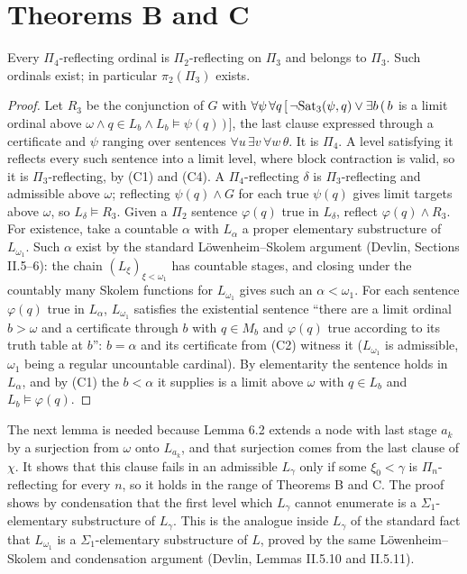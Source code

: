 \documentclass[11pt]{article}
\begin{document}
\section{Theorems B and C}

\begin{statement} Every $\Pi_4$-reflecting ordinal is $\Pi_2$-reflecting on $\Pi_3$ and belongs to $\Pi_3$.
Such ordinals exist; in particular $\pi_2(\Pi_3)$ exists.
\end{statement}

\begin{proof}
Let $R_3$ be the conjunction of $G$ with $\forall\psi\, \forall q\, [\, \neg\mathrm{Sat}_3(\psi, q) \vee \exists b\, (\, b$ is
a limit ordinal above $\omega \wedge q \in L_b \wedge L_b \models \psi(q)\, )\, ]$, the last clause expressed through
a certificate and $\psi$ ranging over sentences $\forall u\, \exists v\, \forall w\, \theta$. It is $\Pi_4$. A level
satisfying it reflects every such sentence into a limit level, where block contraction is valid, so it is
$\Pi_3$-reflecting, by (C1) and (C4). A $\Pi_4$-reflecting $\delta$ is $\Pi_3$-reflecting and admissible above
$\omega$; reflecting $\psi(q) \wedge G$ for each true $\psi(q)$ gives limit targets above $\omega$, so
$L_{\delta} \models R_3$. Given a $\Pi_2$ sentence $\varphi(q)$ true in $L_{\delta}$, reflect $\varphi(q) \wedge R_3$.
For existence, take a countable $\alpha$ with $L_{\alpha}$ a proper elementary substructure of $L_{\omega_1}$. Such
$\alpha$ exist by the standard L\"owenheim--Skolem argument (Devlin, Sections II.5--6): the
chain $(L_{\xi})_{\xi < \omega_1}$ has countable stages, and closing under the countably many Skolem functions for
$L_{\omega_1}$ gives such an $\alpha < \omega_1$. For each sentence $\varphi(q)$ true in $L_{\alpha}$, $L_{\omega_1}$
satisfies the existential sentence ``there are a limit ordinal $b > \omega$ and a certificate through $b$ with
$q \in M_b$ and $\varphi(q)$ true according to its truth table at $b$'': $b = \alpha$ and its certificate from (C2)
witness it ($L_{\omega_1}$ is admissible, $\omega_1$ being a regular uncountable cardinal). By elementarity the
sentence holds in $L_{\alpha}$, and by (C1) the $b < \alpha$ it supplies is a limit above $\omega$ with
$q \in L_b$ and $L_b \models \varphi(q)$.
\end{proof}

The next lemma is needed because Lemma 6.2 extends a node with last stage $a_k$ by a surjection from $\omega$ onto
$L_{a_k}$, and that surjection comes from the last clause of $\chi$. It shows that this clause fails in an admissible
$L_{\gamma}$ only if some $\xi_0 < \gamma$ is $\Pi_n$-reflecting for every $n$, so it holds in the range of Theorems B
and C. The proof shows by
condensation that the first level which $L_{\gamma}$ cannot enumerate is a $\Sigma_1$-elementary substructure of
$L_{\gamma}$. This is the analogue inside $L_{\gamma}$ of the standard fact that $L_{\omega_1}$ is a
$\Sigma_1$-elementary substructure of $L$, proved by the same L\"owenheim--Skolem and condensation argument (Devlin,
Lemmas II.5.10 and II.5.11).
\end{document}
